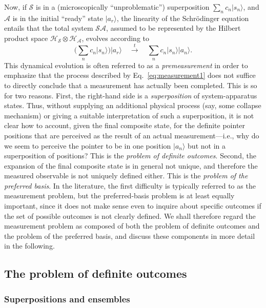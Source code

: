 \documentclass[twocolumn,rmp,aps,amsmath,amsfonts,noshowkeys,noshowpacs]{revtex4}
\newcommand{\ket}[1]{\ensuremath{|{#1\rangle}}}
\begin{document}
Now, if $\mathcal{S}$ is in a (microscopically ``unproblematic'')
superposition $\sum_n c_n \ket{s_n}$, and $\mathcal{A}$ is in the
initial ``ready'' state $\ket{a_r}$, the linearity of the
Schr\"odinger equation entails that the total system $\mathcal{SA}$,
assumed to be represented by the Hilbert product space
$\mathcal{H}_{\mathcal{S}} \otimes \mathcal{H}_{\mathcal{A}}$, evolves
according to
%
\begin{equation}
\label{eq:measurement1} \bigg( \sum_n c_n \ket{s_n}
\bigg) \ket{a_r} \quad \stackrel{t}{\longrightarrow} \quad
\sum_n c_n \ket{s_n} \ket{a_n}.  
\end{equation}
%
This dynamical evolution is often referred to as a
\emph{premeasurement} in order to emphasize that the process described
by Eq.~\eqref{eq:measurement1} does not suffice to directly conclude
that a measurement has actually been completed.  This is so for two
reasons.  First, the right-hand side is a \emph{superposition} of
system-apparatus states.  Thus, without supplying an additional
physical process (say, some collapse mechanism) or giving a suitable
interpretation of such a superposition, it is not clear how to
account, given the final composite state, for the definite pointer
positions that are perceived as the result of an actual
measurement---i.e., why do we seem to perceive the pointer to be in
one position $\ket{a_n}$ but not in a superposition of positions? This
is the {\em problem of definite outcomes}.  Second, the expansion of
the final composite state is in general not unique, and therefore the
measured observable is not uniquely defined either. This is the
\emph{problem of the preferred basis}. In the literature, the first
difficulty is typically referred to as the measurement problem, but
the preferred-basis problem is at least equally important, since it
does not make sense even to inquire about specific outcomes if the set
of possible outcomes is not clearly defined. We shall therefore regard
the measurement problem as composed of both the problem of definite
outcomes and the problem of the preferred basis, and discuss these
components in more detail in the following.


\subsection{\label{sec:defoutcomes}The problem of definite outcomes}

\subsubsection{Superpositions and ensembles}
\end{document}
